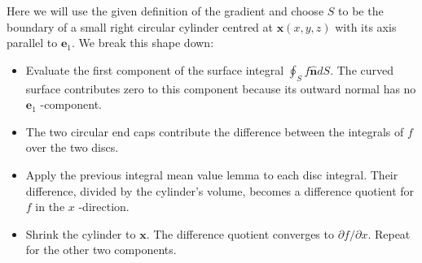 \begin{proofidea}
 
Here we will use the given definition of the gradient and choose \(S\) to be the boundary of a small right circular cylinder centred at \(\mathbf{x}(x,y,z)\) with its axis parallel to \(\mathbf{e}_1\). We break this shape down:

\begin{itemize}
  \item Evaluate the first component of the surface integral \(\oint_S f \hat{\boldsymbol{n}} d S\). The curved surface contributes zero to this component because its outward normal has no \(\boldsymbol{e}_1\) -component.
  \item The two circular end caps contribute the difference between the integrals of \(f\) over the two discs.
  \item Apply the previous integral mean value lemma to each disc integral. Their difference, divided by the cylinder's volume, becomes a difference quotient for \(f\) in the \(x\) -direction.
  \item Shrink the cylinder to \(\boldsymbol{x}\). The difference quotient converges to \(\partial f / \partial x\). Repeat for the other two components.
\end{itemize}

\end{proofidea}
  
